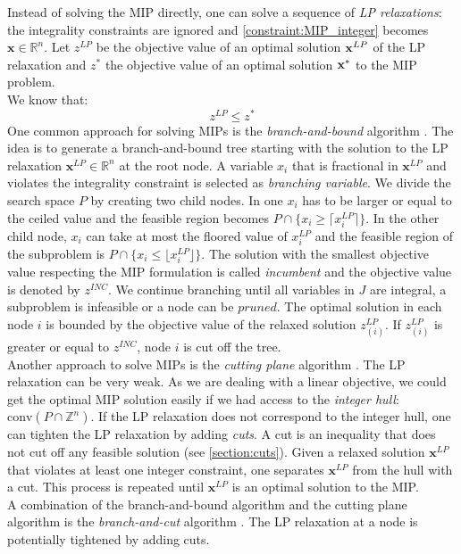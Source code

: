 Instead of solving the MIP directly, one can solve a sequence of \textit{LP relaxations}: the integrality constraints are ignored and \cref{constraint:MIP_integer} becomes $\mathbf x \in \mathbb{R}^n$.
Let $z^{LP}$ be the objective value of an optimal solution $\bold{x}^{LP}$ of the LP relaxation and $z^*$ the objective value of an optimal solution $\bold{x^*}$ to the MIP problem.\\
We know that: 
\begin{equation*} \label{Eq:bound}
    z^{LP} \leq z^*
\end{equation*}
\newpage
One common approach for solving MIPs is the \textit{branch-and-bound} algorithm \cite{integer_programming}. The idea is to generate a branch-and-bound tree starting with the solution to the LP relaxation $\mathbf x^{LP} \in \mathbb{R}^n$ at the root node. A variable $x_i$ that is fractional in $\mathbf x^{LP}$ and violates the integrality constraint is selected as \textit{branching variable}. We divide the search space $P$ by creating two child nodes. In one $x_i$ has to be larger or equal to the ceiled value and the feasible region becomes $P \cap \{x_i \geq \lceil x_i^{LP} \rceil \}$. In the other child node, $x_i$ can take at most the floored value of $x_i^{LP}$ and the feasible region of the subproblem is $P \cap \{x_i \leq \lfloor x_i^{LP} \rfloor \}$. The solution with the smallest objective value respecting the MIP formulation is called \textit{incumbent} and the objective value is denoted by $z^{INC}$. We continue branching until all variables in $J$ are integral, a subproblem is infeasible or a node can be $pruned$. The optimal solution in each node $i$ is bounded by the objective value of the relaxed solution $z^{LP}_{(i)}$. If $z^{LP}_{(i)}$ is greater or equal to $z^{INC}$, node $i$ is cut off the tree. \\
Another approach to solve MIPs is the \textit{cutting plane} algorithm \cite{integer_programming}. The LP relaxation can be very weak. As we are dealing with a linear objective, we could get the optimal MIP solution easily if we had access to the \textit{integer hull}: $\text{conv}(P \cap \mathbb{Z}^n)$. If the LP relaxation does not correspond to the integer hull, one can tighten the LP relaxation by adding \textit{cuts}. A cut is an inequality that does not cut off any feasible solution (see \cref{section:cuts}). Given a relaxed solution $\mathbf x^{LP}$ that violates at least one integer constraint, one separates $\mathbf x^{LP}$ from the hull with a cut. This process is repeated until $\mathbf x^{LP}$ is an optimal solution to the MIP. \\
A combination of the branch-and-bound algorithm and the cutting plane algorithm is the \textit{branch-and-cut} algorithm \cite{integer_programming}. The LP relaxation at a node is potentially tightened by adding cuts. 

